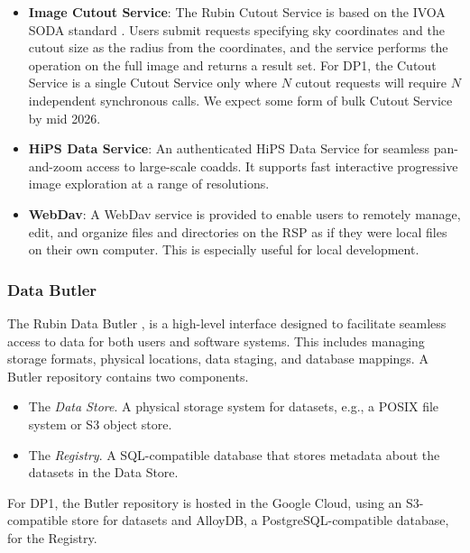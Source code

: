 \begin{itemize}
\vspace{0.1cm}
\item \textbf{Image Cutout Service}: The Rubin Cutout Service \citep[][]{SQR-063, SQR-093} is based on the  IVOA SODA standard \citep[][]{2017ivoa.spec.0517B}.
Users submit requests specifying sky coordinates and the cutout size as the radius from the coordinates, and the  service performs the operation on the full image and returns a result set.
For \gls{DP1}, the  Cutout Service is a single Cutout Service only where $N$ cutout requests will require $N$ independent synchronous calls.
We expect some form of bulk Cutout Service by mid 2026.

\vspace{0.1cm}
\item \textbf{HiPS Data Service}: An authenticated \gls{HiPS} \citep[][]{2017ivoa.spec.0519F} Data Service for seamless pan-and-zoom access to large-scale coadds.
It supports fast interactive progressive image exploration at a range of resolutions.

\vspace{0.1cm}
\item \textbf{\gls{WebDav}}: A \gls{WebDav} service is provided to enable users to remotely manage, edit, and organize files and directories on the \gls{RSP} as if they were local files on their own computer. This is especially useful for local development.
\end{itemize}

\subsubsection{Data Butler}
\label{sssec:data_butler}

The Rubin Data Butler \citep[][]{2022SPIE12189E..11J, 2023arXiv230303313L},  is a high-level interface designed to facilitate seamless access to data for both users and software systems.
This includes managing storage formats, physical locations, data staging, and database mappings.
A \gls{Butler} repository contains two components.
\begin{itemize}
    \item The \emph{Data Store}. A physical storage system for datasets, e.g., a \gls{POSIX} file system or \gls{S3} object store.
    \item The \emph{Registry}. A \gls{SQL}-compatible database that stores metadata about the datasets in the Data Store.
\end{itemize}
For \gls{DP1}, the Butler repository is hosted in the Google Cloud, using an \gls{S3}-compatible store for datasets and AlloyDB, a PostgreSQL-compatible database, for the Registry.

